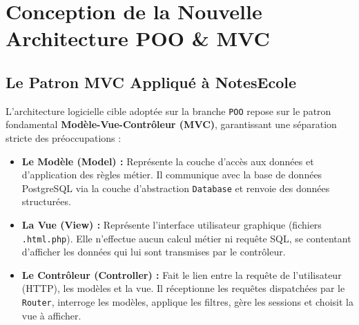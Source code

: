 \documentclass[11pt,a4paper,oneside]{report}
\begin{document}
\chapter{Conception de la Nouvelle Architecture POO \& MVC}
\label{chap:poo}

\section{Le Patron MVC Appliqué à NotesEcole}

L'architecture logicielle cible adoptée sur la branche \texttt{POO} repose sur le patron fondamental \textbf{Modèle-Vue-Contrôleur (MVC)}, garantissant une séparation stricte des préoccupations :

\begin{itemize}[label=\textcolor{primaryMed}{\textbullet}]
    \item \textbf{Le Modèle (Model) :} Représente la couche d'accès aux données et d'application des règles métier. Il communique avec la base de données PostgreSQL via la couche d'abstraction \texttt{Database} et renvoie des données structurées.
    \item \textbf{La Vue (View) :} Représente l'interface utilisateur graphique (fichiers \texttt{.html.php}). Elle n'effectue aucun calcul métier ni requête SQL, se contentant d'afficher les données qui lui sont transmises par le contrôleur.
    \item \textbf{Le Contrôleur (Controller) :} Fait le lien entre la requête de l'utilisateur (HTTP), les modèles et la vue. Il réceptionne les requêtes dispatchées par le \texttt{Router}, interroge les modèles, applique les filtres, gère les sessions et choisit la vue à afficher.
\end{itemize}
\end{document}
